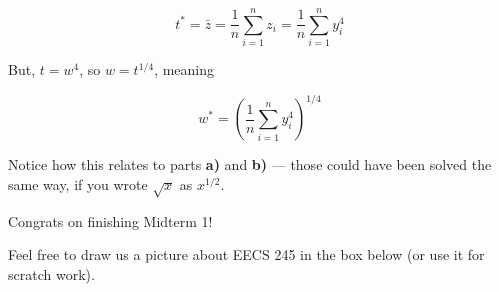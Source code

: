\documentclass[11pt]{article}
\begin{document}
\begin{prob}[(20 pts)]
\begin{subprob}
\begin{solution}
$$t^* = \bar{z} = \frac{1}{n} \sum_{i=1}^n z_i = \frac{1}{n} \sum_{i=1}^n y_i^4$$

But, $t = w^4$, so $w = t^{1/4}$, meaning

$$w^* = \boxed{\left( \frac{1}{n} \sum_{i=1}^n y_i^4 \right)^{1/4}}$$

Notice how this relates to parts \textbf{a)} and \textbf{b)} --- those could have been solved the same way, if you wrote $\sqrt{x}$ as $x^{1/2}$.

\end{solution}

\end{subprob}
    
\end{prob}

\newpage

Congrats on finishing Midterm 1!

Feel free to draw us a picture about EECS 245 in the box below (or use it for scratch work).

\emptybox{21cm}
\end{document}
